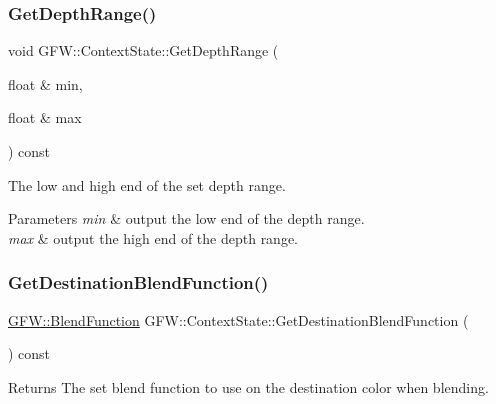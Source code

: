 \subsubsection{\texorpdfstring{Get\+Depth\+Range()}{GetDepthRange()}}
{\footnotesize\ttfamily void G\+F\+W\+::\+Context\+State\+::\+Get\+Depth\+Range (\begin{DoxyParamCaption}\item[{float \&}]{min,  }\item[{float \&}]{max }\end{DoxyParamCaption}) const}



The low and high end of the set depth range. 


\begin{DoxyParams}{Parameters}
{\em min} & output the low end of the depth range. \\
\hline
{\em max} & output the high end of the depth range. \\
\hline
\end{DoxyParams}
\mbox{\label{class_g_f_w_1_1_context_state_a90b57498e47494b9c3f5d70c61c4ec38}} 
\subsubsection{\texorpdfstring{Get\+Destination\+Blend\+Function()}{GetDestinationBlendFunction()}}
{\footnotesize\ttfamily \hyperlink{namespace_g_f_w_ac19434e926d01e02140f07e74ff36f3c}{G\+F\+W\+::\+Blend\+Function} G\+F\+W\+::\+Context\+State\+::\+Get\+Destination\+Blend\+Function (\begin{DoxyParamCaption}{ }\end{DoxyParamCaption}) const}

\begin{DoxyReturn}{Returns}
The set blend function to use on the destination color when blending. 
\end{DoxyReturn}
\mbox{\label{class_g_f_w_1_1_context_state_a35a9f2abcdd97e409ede000f9338b256}} 
